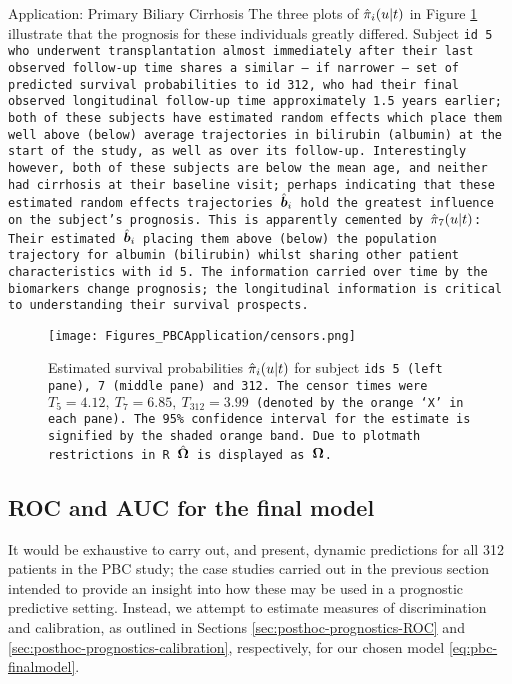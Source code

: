 \begin{chapter}{\label{cha:app-PBC}Application: Primary Biliary Cirrhosis}
  The three plots of $\hat{\pi}_i\!\left( u|t\right)$ in Figure \ref{fig:pbc-final-model-dynpreds-censors} illustrate that the prognosis for these individuals greatly differed. Subject \tt{id} 5 who underwent transplantation almost immediately after their last observed follow-up time shares a similar -- if narrower -- set of predicted survival probabilities to \tt{id} 312, who had their final observed longitudinal follow-up time approximately 1.5 years earlier; both of these subjects have estimated random effects which place them well above (below) average trajectories in bilirubin (albumin) at the start of the study, as well as over its follow-up. Interestingly however, both of these subjects are below the mean \tt{age}, and neither had cirrhosis at their baseline visit; perhaps indicating that these estimated random effects trajectories $\hat{\bm{b}}_i$ hold the greatest influence on the subject's prognosis. This is apparently cemented by $\hat{\pi}_7\!\left( u|t\right)$: Their estimated $\hat{\bm{b}}_i$ placing them above (below) the population trajectory for albumin (bilirubin) whilst sharing other patient characteristics with \tt{id} 5. The information carried over time by the biomarkers change prognosis; the longitudinal information is critical to understanding their survival prospects.

  \begin{figure}[ht]
      \centering
      \texttt{[image: Figures\_PBCApplication/censors.png]}
      \caption{Estimated survival probabilities $\hat{\pi}_i\!\left( u|t\right)$ for subject \tt{id}s 5 (left pane), 7 (middle pane) and 312. The censor times were $T_5=4.12,\ T_7=6.85,\ T_{312}=3.99$ (denoted by the orange `X' in each pane). The 95\% confidence interval for the estimate is signified by the shaded orange band. Due to \tt{plotmath} restrictions in \tt{R} $\hat{\bm{\Omega}}$ is displayed as $\bm{\mathrm{\Omega}}$.}
      \label{fig:pbc-final-model-dynpreds-censors}
  \end{figure}

  \resettocmain
  \subsection{ROC and AUC for the final model}\label{sec:pbc-finalmodel-rocauc}
  It would be exhaustive to carry out, and present, dynamic predictions for all 312 patients in the PBC study; the case studies carried out in the previous section intended to provide an insight into how these may be used in a prognostic predictive setting. Instead, we attempt to estimate measures of discrimination and calibration, as outlined in Sections \ref{sec:posthoc-prognostics-ROC} and \ref{sec:posthoc-prognostics-calibration}, respectively, for our chosen model \eqref{eq:pbc-finalmodel}.


\end{chapter}
